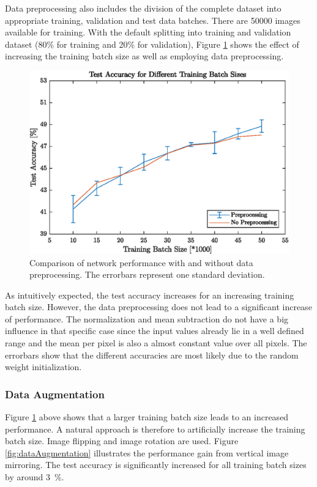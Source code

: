   	Data preprocessing also includes the division of the complete dataset into appropriate training, validation and test data batches. There are 50000 images available for training. With the default splitting into training and validation dataset (80\% for training and 20\% for validation), Figure \ref{fig:dataPreprocessing} shows the effect of increasing the training batch size as well as employing data preprocessing.

  	\begin{figure}[h!]
  		\centering
   		\includegraphics{images/dataPreprocessing}
   		\caption{Comparison of network performance with and without data preprocessing. The errorbars represent one standard deviation.}
   		\label{fig:dataPreprocessing}
   	\end{figure}

   	As intuitively expected, the test accuracy increases for an increasing training batch size. However, the data preprocessing does not lead to a significant increase of performance. The normalization and mean subtraction do not have a big influence in that specific case since the input values already lie in a well defined range and the mean per pixel is also a almost constant value over all pixels. The errorbars show that the different accuracies are most likely due to the random weight initialization.

\FloatBarrier
\subsubsection{Data Augmentation}

   	Figure \ref{fig:dataPreprocessing} above shows that a larger training batch size leads to an increased performance. A natural approach is therefore to artificially increase the training batch size. Image flipping and image rotation are used. Figure \ref{fig:dataAugmentation} illustrates the performance gain from vertical image mirroring. The test accuracy is significantly increased for all training batch sizes by around \SI{3}{\percent}.

